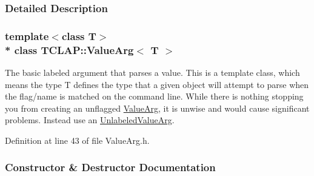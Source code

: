 \subsubsection{Detailed Description}
\subsubsection*{template$<$class T$>$\\*
class T\+C\+L\+A\+P\+::\+Value\+Arg$<$ T $>$}

The basic labeled argument that parses a value. This is a template class, which means the type T defines the type that a given object will attempt to parse when the flag/name is matched on the command line. While there is nothing stopping you from creating an unflagged \hyperlink{classTCLAP_1_1ValueArg}{Value\+Arg}, it is unwise and would cause significant problems. Instead use an \hyperlink{classTCLAP_1_1UnlabeledValueArg}{Unlabeled\+Value\+Arg}. 

Definition at line 43 of file Value\+Arg.\+h.



\subsubsection{Constructor \& Destructor Documentation}

